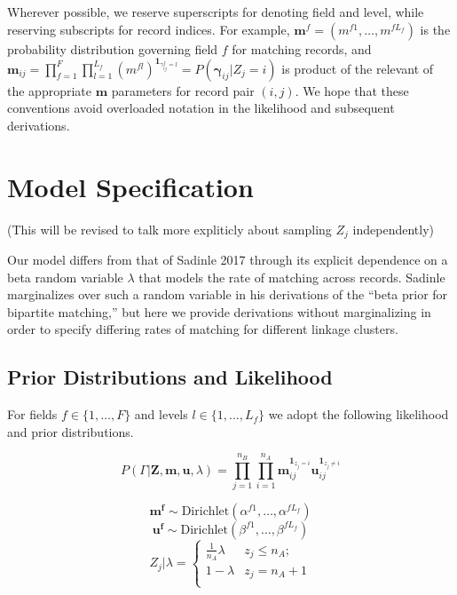 \documentclass[
  12pt,
]{article}
\begin{document}
Wherever possible, we reserve superscripts for denoting field and level,
while reserving subscripts for record indices. For example,
\(\mathbf{m}^f = (m^{f1}, \ldots, m^{fL_f})\) is the probability
distribution governing field \(f\) for matching records, and
\(\mathbf{m}_{ij}= \prod_{f=1}^{F}\prod_{l=1}^{L_f} \left(m^{fl}\right)^{\mathbf{1}_{\gamma_{ij}^f = l}} = P(\boldsymbol{\gamma}_{ij}|Z_j = i)\)
is product of the relevant of the appropriate \(\mathbf{m}\) parameters
for record pair \((i,j)\). We hope that these conventions avoid
overloaded notation in the likelihood and subsequent derivations.

\hypertarget{model-specification}{%
\section{Model Specification}\label{model-specification}}

(This will be revised to talk more expliticly about sampling \(Z_j\)
independently)

Our model differs from that of Sadinle 2017 through its explicit
dependence on a beta random variable \(\lambda\) that models the rate of
matching across records. Sadinle marginalizes over such a random
variable in his derivations of the ``beta prior for bipartite
matching,'' but here we provide derivations without marginalizing in
order to specify differing rates of matching for different linkage
clusters.

\hypertarget{prior-distributions-and-likelihood}{%
\subsection{Prior Distributions and
Likelihood}\label{prior-distributions-and-likelihood}}

For fields \(f \in \{1, \ldots, F\}\) and levels
\(l\in \{1, \ldots, L_f\}\) we adopt the following likelihood and prior
distributions.

\[P(\Gamma|\mathbf{Z}, \mathbf{m}, \mathbf{u}, \lambda) =\prod_{j=1}^{n_B}  \prod_{i=1}^{n_A}\mathbf{m}_{ij}^{\mathbf{1}_{z_j = i}}\mathbf{u}_{ij}^{\mathbf{1}_{z_j \neq i}}\]

\[\mathbf{m^{f}} \sim \text{Dirichlet}(\alpha^{f1}, \ldots, \alpha^{fL_f})\]
\[\mathbf{u^{f}} \sim \text{Dirichlet}(\beta^{f1}, \ldots, \beta^{fL_f})\]
\[Z_j | \lambda =
\begin{cases} 
    \frac{1}{n_A}\lambda  & z_j \leq n_A; \\
     1-\lambda &  z_j  = n_A + 1 \\
\end{cases}\]
\end{document}
